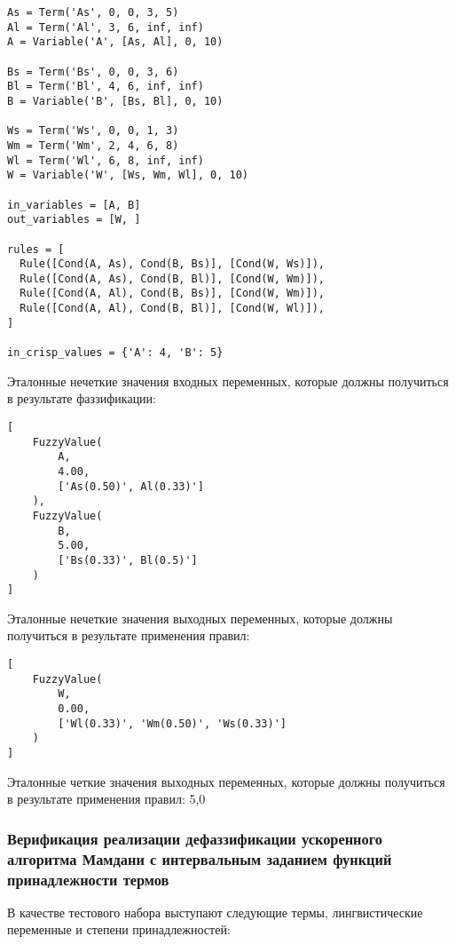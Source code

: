 \begin{lstlisting}[style=pythonstyle,caption={  }, label=lst:func:1]
As = Term('As', 0, 0, 3, 5)
Al = Term('Al', 3, 6, inf, inf)
A = Variable('A', [As, Al], 0, 10)

Bs = Term('Bs', 0, 0, 3, 6)
Bl = Term('Bl', 4, 6, inf, inf)
B = Variable('B', [Bs, Bl], 0, 10)

Ws = Term('Ws', 0, 0, 1, 3)
Wm = Term('Wm', 2, 4, 6, 8)
Wl = Term('Wl', 6, 8, inf, inf)
W = Variable('W', [Ws, Wm, Wl], 0, 10)

in_variables = [A, B]
out_variables = [W, ]

rules = [
  Rule([Cond(A, As), Cond(B, Bs)], [Cond(W, Ws)]),
  Rule([Cond(A, As), Cond(B, Bl)], [Cond(W, Wm)]),
  Rule([Cond(A, Al), Cond(B, Bs)], [Cond(W, Wm)]),
  Rule([Cond(A, Al), Cond(B, Bl)], [Cond(W, Wl)]),
]

in_crisp_values = {'A': 4, 'B': 5}
\end{lstlisting}

Эталонные нечеткие значения входных переменных, которые должны получиться в результате фаззификации:

\begin{lstlisting}[style=pythonstyle,caption={  }, label=lst:func:1]
[
	FuzzyValue(
		A, 
		4.00, 
		['As(0.50)', Al(0.33)']
	), 
	FuzzyValue(
		B, 
		5.00, 
		['Bs(0.33)', Bl(0.5)']
	)
]

\end{lstlisting}

Эталонные нечеткие значения выходных переменных, которые должны получиться в результате применения правил:

\begin{lstlisting}[style=pythonstyle,caption={  }, label=lst:func:1]
[
	FuzzyValue(
		W, 
		0.00, 
		['Wl(0.33)', 'Wm(0.50)', 'Ws(0.33)']
	)
]
\end{lstlisting}

Эталонные четкие значения выходных переменных, которые должны получиться в результате применения правил: 5,0

\subsubsection{Верификация реализации дефаззификации ускоренного алгоритма Мамдани с интервальным заданием функций принадлежности термов }

В качестве тестового набора выступают следующие термы, лингвистические переменные и степени принадлежностей:


